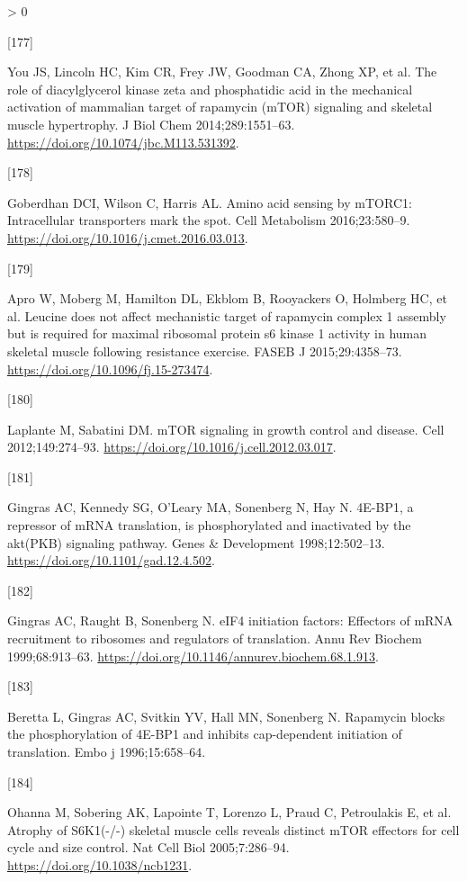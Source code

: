 \documentclass[twoside,10pt]{gihclass} %
\newlength{\cslhangindent}
\newlength{\csllabelwidth}
\newenvironment{CSLReferences}[3] %
 {%
  \setlength{\parindent}{0pt}
  \ifodd #1 \everypar{\setlength{\hangindent}{\cslhangindent}}\ignorespaces\fi
  \ifnum #2 > 0
  \setlength{\parskip}{#2\baselineskip}
  \fi
 }%
 {}
\newcommand{\CSLLeftMargin}[1]{\parbox[t]{\maxof{\widthof{#1}}{\csllabelwidth}}{#1}}
\newcommand{\CSLRightInline}[1]{\parbox[t]{\linewidth}{#1}}
\begin{document}
\begin{CSLReferences}{0}{0}
\leavevmode\hypertarget{ref-RN1728}{}%
\CSLLeftMargin{{[}177{]} }
\CSLRightInline{You JS, Lincoln HC, Kim CR, Frey JW, Goodman CA, Zhong XP, et al. The role of diacylglycerol kinase zeta and phosphatidic acid in the mechanical activation of mammalian target of rapamycin (mTOR) signaling and skeletal muscle hypertrophy. J Biol Chem 2014;289:1551--63. \url{https://doi.org/10.1074/jbc.M113.531392}.}

\leavevmode\hypertarget{ref-RN2848}{}%
\CSLLeftMargin{{[}178{]} }
\CSLRightInline{Goberdhan DCI, Wilson C, Harris AL. Amino acid sensing by mTORC1: Intracellular transporters mark the spot. Cell Metabolism 2016;23:580--9. \url{https://doi.org/10.1016/j.cmet.2016.03.013}.}

\leavevmode\hypertarget{ref-RN1641}{}%
\CSLLeftMargin{{[}179{]} }
\CSLRightInline{Apro W, Moberg M, Hamilton DL, Ekblom B, Rooyackers O, Holmberg HC, et al. Leucine does not affect mechanistic target of rapamycin complex 1 assembly but is required for maximal ribosomal protein s6 kinase 1 activity in human skeletal muscle following resistance exercise. FASEB J 2015;29:4358--73. \url{https://doi.org/10.1096/fj.15-273474}.}

\leavevmode\hypertarget{ref-RN2139}{}%
\CSLLeftMargin{{[}180{]} }
\CSLRightInline{Laplante M, Sabatini DM. mTOR signaling in growth control and disease. Cell 2012;149:274--93. \url{https://doi.org/10.1016/j.cell.2012.03.017}.}

\leavevmode\hypertarget{ref-RN2837}{}%
\CSLLeftMargin{{[}181{]} }
\CSLRightInline{Gingras AC, Kennedy SG, O'Leary MA, Sonenberg N, Hay N. 4E-BP1, a repressor of mRNA translation, is phosphorylated and inactivated by the akt(PKB) signaling pathway. Genes \& Development 1998;12:502--13. \url{https://doi.org/10.1101/gad.12.4.502}.}

\leavevmode\hypertarget{ref-RN2838}{}%
\CSLLeftMargin{{[}182{]} }
\CSLRightInline{Gingras AC, Raught B, Sonenberg N. eIF4 initiation factors: Effectors of mRNA recruitment to ribosomes and regulators of translation. Annu Rev Biochem 1999;68:913--63. \url{https://doi.org/10.1146/annurev.biochem.68.1.913}.}

\leavevmode\hypertarget{ref-RN2840}{}%
\CSLLeftMargin{{[}183{]} }
\CSLRightInline{Beretta L, Gingras AC, Svitkin YV, Hall MN, Sonenberg N. Rapamycin blocks the phosphorylation of 4E-BP1 and inhibits cap-dependent initiation of translation. Embo j 1996;15:658--64.}

\leavevmode\hypertarget{ref-RN2828}{}%
\CSLLeftMargin{{[}184{]} }
\CSLRightInline{Ohanna M, Sobering AK, Lapointe T, Lorenzo L, Praud C, Petroulakis E, et al. Atrophy of S6K1(-/-) skeletal muscle cells reveals distinct mTOR effectors for cell cycle and size control. Nat Cell Biol 2005;7:286--94. \url{https://doi.org/10.1038/ncb1231}.}


\end{CSLReferences}
\end{document}
